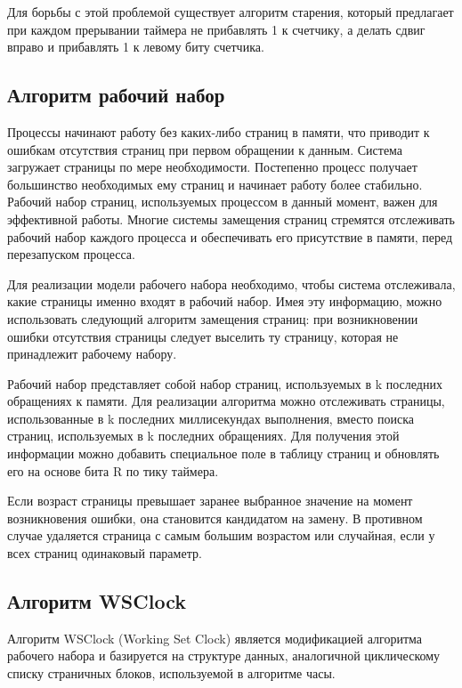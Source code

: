 Для борьбы с этой проблемой существует алгоритм старения, который предлагает при каждом прерывании таймера не прибавлять 1 к счетчику, а делать сдвиг вправо и прибавлять 1 к левому биту счетчика.

\subsection{Алгоритм рабочий набор}

Процессы начинают работу без каких-либо страниц в памяти,
что приводит к ошибкам отсутствия страниц при первом обращении к данным.
Система загружает страницы по мере необходимости.
Постепенно процесс получает большинство необходимых ему страниц и начинает работу более стабильно.
Рабочий набор страниц, используемых процессом в данный
момент, важен для эффективной работы. 
Многие системы замещения страниц стремятся отслеживать рабочий набор каждого процесса и обеспечивать его присутствие в памяти, перед перезапуском процесса.

Для реализации модели рабочего набора необходимо, чтобы система отслеживала, какие страницы именно входят в рабочий набор.
Имея эту информацию, можно использовать следующий алгоритм замещения страниц: при возникновении ошибки отсутствия страницы следует выселить ту страницу, которая не принадлежит рабочему набору.

Рабочий набор представляет собой набор страниц, используемых в k последних обращениях к памяти. 
Для реализации алгоритма можно отслеживать страницы, использованные в k последних миллисекундах выполнения, вместо поиска страниц, используемых в k последних обращениях.
Для получения этой информации можно добавить специальное поле в таблицу страниц и обновлять его на основе бита R по тику таймера.

Если возраст страницы превышает заранее выбранное значение на момент возникновения ошибки, она становится кандидатом на замену. 
В противном случае удаляется страница с самым большим возрастом или случайная, если у всех страниц одинаковый параметр.

\subsection{Алгоритм WSClock}

Алгоритм WSClock (Working Set Clock) является модификацией алгоритма рабочего набора и базируется на структуре данных, аналогичной циклическому списку страничных блоков, используемой в алгоритме часы.

